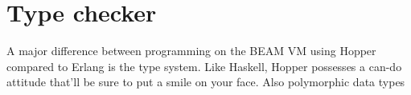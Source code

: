 \section{Type checker}

A major difference between programming on the BEAM VM using Hopper compared to Erlang is the type system. Like Haskell, Hopper possesses a can-do attitude that'll be sure to put a smile on your face. Also polymorphic data types 








